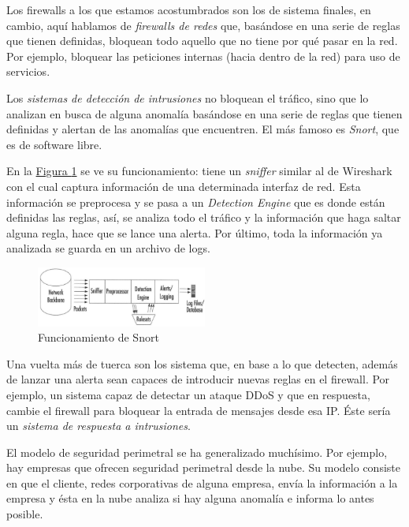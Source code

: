 \documentclass[10pt,a4paper,spanish]{report}
\begin{document}
Los firewalls a los que estamos acostumbrados son los de sistema finales, en cambio, aquí hablamos de \textit{\textcolor{tema2}{firewalls de redes}} que, basándose en una serie de reglas que tienen definidas, bloquean todo aquello que no tiene por qué pasar en la red. Por ejemplo, bloquear las peticiones internas (hacia dentro de la red) para uso de servicios.

Los \textit{\textcolor{tema2}{sistemas de detección de intrusiones}} no bloquean el tráfico, sino que lo analizan en busca de alguna anomalía basándose en una serie de reglas que tienen definidas y alertan de las anomalías que encuentren. El más famoso es \textit{\textcolor{tema2}{Snort}}, que es de software libre. 

En la \hyperref[snort]{Figura \ref*{snort}} se ve su funcionamiento: tiene un \textit{\textcolor{tema2}{sniffer}} similar al de Wireshark con el cual captura información de una determinada interfaz de red. Esta información se preprocesa y se pasa a un \textit{\textcolor{tema2}{Detection Engine}} que es donde están definidas las reglas, así, se analiza todo el tráfico y la información que haga saltar alguna regla, hace que se lance una alerta. Por último, toda la información ya analizada se guarda en un archivo de logs.

\begin{figure}[!h]
  \centering
  \includegraphics[width=0.5\textwidth]{tema2_11}
  \caption{Funcionamiento de Snort}
  \label{snort}
\end{figure}

Una vuelta más de tuerca son los sistema que, en base a lo que detecten, además de lanzar una alerta sean capaces de introducir nuevas reglas en el firewall. Por ejemplo, un sistema capaz de detectar un ataque DDoS y que en respuesta, cambie el firewall para bloquear la entrada de mensajes desde esa IP. Éste sería un \textit{\textcolor{tema2}{sistema de respuesta a intrusiones}}.

El modelo de seguridad perimetral se ha generalizado muchísimo. Por ejemplo, hay empresas que ofrecen seguridad perimetral desde la nube. Su modelo consiste en que el cliente, redes corporativas de alguna empresa, envía la información a la empresa y ésta en la nube analiza si hay alguna anomalía e informa lo antes posible. 
\end{document}
